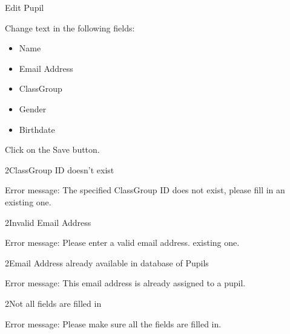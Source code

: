 
\begin{uc}{Edit Pupil}


    \begin{uc-mss}
    \item Change text in the following fields:
        \begin{itemize}
            \item Name
            \item Email Address
            \item ClassGroup
            \item Gender
            \item Birthdate
        \end{itemize}
    \item Click on the Save button.
    \end{uc-mss}

    \begin{uc-ext}

        \begin{uc-fail}{2}{ClassGroup ID doesn't exist}
        \item Error message: The specified ClassGroup ID does not exist, please
            fill in an existing one.
        \end{uc-fail}

        \begin{uc-fail}{2}{Invalid Email Address}
        \item Error message: Please enter a valid email address. existing one.
        \end{uc-fail}

        \begin{uc-fail}{2}{Email Address already available in database of
            Pupils}
        \item Error message: This email address is already assigned to a pupil.
        \end{uc-fail}

        \begin{uc-fail}{2}{Not all fields are filled in}
        \item Error message: Please make sure all the fields are filled in.
        \end{uc-fail}

    \end{uc-ext}


\end{uc}
